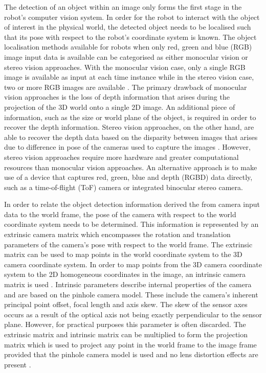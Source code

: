The detection of an object within an image only forms the first stage in the robot's computer vision system. In order for the robot to interact with the object of interest in the physical world, the detected object needs to be localised such that its pose with respect to the robot's coordinate system is known. The object localisation methods available for robots when only red, green and blue (RGB) image input data is available can be categorised as either monocular vision or stereo vision approaches. With the monocular vision case, only a single RGB image is available as input at each time instance while in the stereo vision case, two or more RGB images are available \cite{Liu:6DOF_Object_Localization}. The primary drawback of monocular vision approaches is the loss of depth information that arises during the projection of the 3D world onto a single 2D image. An additional piece of information, such as the size or world plane of the object, is required in order to recover the depth information. Stereo vision approaches, on the other hand, are able to recover the depth data based on the disparity between images that arises due to difference in pose of the cameras used to capture the images \cite{Azad:Stereo-based_6D_Object_Localization}. However, stereo vision approaches require more hardware and greater computational resources than monocular vision approaches. An alternative approach is to make use of a device that captures red, green, blue and depth (RGBD) data directly, such as a time-of-flight (ToF) camera or integrated binocular stereo camera. 

In order to relate the object detection information derived the from camera input data to the world frame, the pose of the camera with respect to the world coordinate system needs to be determined. This information is represented by an extrinsic camera matrix which encompasses the rotation and translation parameters of the camera's pose with respect to the world frame. The extrinsic matrix can be used to map points in the world coordinate system to the 3D camera coordinate system. In order to map points from the 3D camera coordinate system to the 2D homogeneous coordinates in the image, an intrinsic camera matrix is used \cite{Szeliski:Computer_Vision_Algorithms_and_Applications}. Intrinsic parameters describe internal properties of the camera and are based on the pinhole camera model. These include the camera's inherent principal point offset, focal length and axis skew. The skew of the sensor axes occurs as a result of the optical axis not being exactly perpendicular to the sensor plane. However, for practical purposes this parameter is often discarded. The extrinsic matrix and intrinsic matrix can be multiplied to form the projection matrix which is used to project any point in the world frame to the image frame provided that the pinhole camera model is used and no lens distortion effects are present \cite{OpenCV:Camera_Calibration}.

